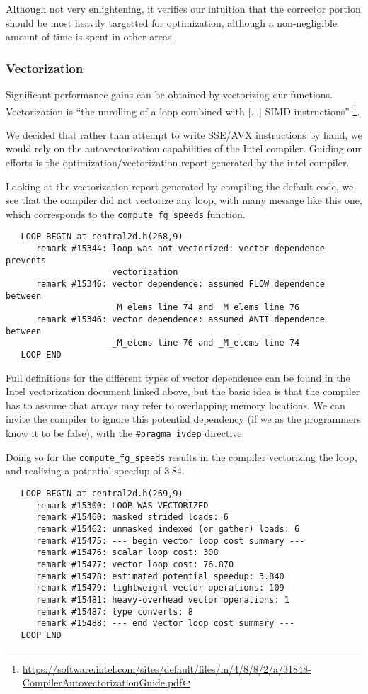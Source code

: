 Although not very enlightening, it verifies our intuition that the corrector
portion should be most heavily targetted for optimization, although a 
non-negligible amount of time is spent in other areas.

\subsubsection{Vectorization}
\label{sec-profile-vectorization}
Significant performance gains can be obtained by vectorizing our functions.
Vectorization is ``the unrolling of a loop combined with [...] SIMD instructions''
\footnote{\url{https://software.intel.com/sites/default/files/m/4/8/8/2/a/31848-CompilerAutovectorizationGuide.pdf}}.

We decided that rather than attempt to write SSE/AVX instructions by hand, we 
would rely on the autovectorization capabilities of the Intel compiler.
Guiding our efforts is the optimization/vectorization report generated by the intel
compiler.

Looking at the vectorization report generated by compiling the default code, we see
that the compiler did not vectorize any loop, with many message like this one, which
corresponds to the \texttt{compute\_fg\_speeds} function.

\begin{lstlisting}
   LOOP BEGIN at central2d.h(268,9)
      remark #15344: loop was not vectorized: vector dependence prevents 
                     vectorization
      remark #15346: vector dependence: assumed FLOW dependence between 
                     _M_elems line 74 and _M_elems line 76
      remark #15346: vector dependence: assumed ANTI dependence between 
                     _M_elems line 76 and _M_elems line 74
   LOOP END
\end{lstlisting}

Full definitions for the different types of vector dependence can be found in the 
Intel vectorization document linked above,
but the basic idea is that the compiler has to assume that arrays may refer to
overlapping memory locations.  We can invite the compiler to ignore this potential
dependency (if we as the programmers know it to be false), with the
\texttt{\#pragma ivdep} directive.

Doing so for the \texttt{compute\_fg\_speeds} results in the compiler
vectorizing the loop, and realizing a potential speedup of 3.84.

\begin{lstlisting}
   LOOP BEGIN at central2d.h(269,9)
      remark #15300: LOOP WAS VECTORIZED
      remark #15460: masked strided loads: 6 
      remark #15462: unmasked indexed (or gather) loads: 6 
      remark #15475: --- begin vector loop cost summary ---
      remark #15476: scalar loop cost: 308 
      remark #15477: vector loop cost: 76.870 
      remark #15478: estimated potential speedup: 3.840 
      remark #15479: lightweight vector operations: 109 
      remark #15481: heavy-overhead vector operations: 1 
      remark #15487: type converts: 8 
      remark #15488: --- end vector loop cost summary ---
   LOOP END
\end{lstlisting}

